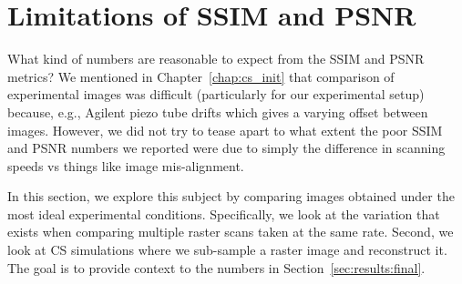 \documentclass[twocolumn,twoside]{IEEEtran/IEEEtran}
\begin{document}
\section{Limitations of SSIM and PSNR}\label{sec:psnr_ssim_limits}
What kind of numbers are reasonable to expect from the SSIM and PSNR metrics? We
mentioned in Chapter~\ref{chap:cs_init} that comparison of experimental images
was difficult (particularly for our experimental setup) because, e.g., Agilent
piezo tube drifts which gives a varying offset between images. However, we did
not try to tease apart to what extent the poor SSIM and PSNR numbers we reported
were due to simply the difference in scanning speeds vs things like image
mis-alignment.

In this section, we explore this subject by comparing images obtained under the
most ideal experimental conditions. Specifically, we look at the variation that
exists when comparing multiple raster scans taken at the same rate. Second, we
look at CS simulations where we sub-sample a raster image and reconstruct it.
The goal is to provide context to the numbers in
Section~\ref{sec:results:final}.
\end{document}
